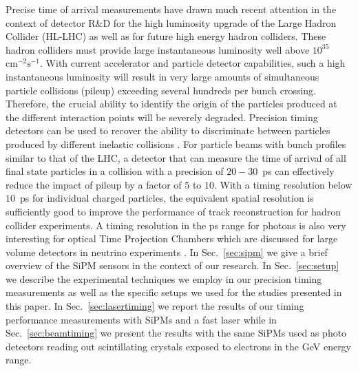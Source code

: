 Precise time of arrival measurements have drawn much recent attention in the 
context of detector R\&D for the high luminosity upgrade of the Large Hadron 
Collider (HL-LHC) as well as for future high energy hadron colliders.  
These hadron colliders must provide large 
instantaneous luminosity well above $10^{35}$~$\mathrm{cm}^{-2}\mathrm{s}^{-1}$.
With current accelerator and particle detector capabilities, such a high 
instantaneous luminosity will result in very large amounts
of simultaneous particle collisions (pileup) exceeding several hundreds per
bunch crossing. Therefore, the crucial ability to identify the origin 
of the particles produced at the different interaction points will be severely 
degraded. Precision timing detectors can be used to recover the ability to 
discriminate between particles produced by different inelastic collisions \cite{adielba}.
For particle beams with bunch profiles similar to that of the LHC, a detector 
that can measure the time of arrival of all final state particles in a collision
with a precision of $20-30$~ps can effectively reduce the impact of
pileup by a factor of $5$ to $10$. 
%
% 
% 
With a timing resolution below $10$~ps for individual charged particles, the equivalent spatial 
resolution is sufficiently good to improve the performance of 
track reconstruction \cite{4dtracking} for hadron collider experiments.
A timing resolution in the ps range for photons is also very interesting for optical Time Projection Chambers 
which are discussed for large volume detectors in neutrino experiments \cite{lappd, otpc}. 
%
%
%
In Sec.~\ref{sec:sipm} we give a brief overview of the SiPM sensors in the context of our research. In Sec.~\ref{sec:setup} 
we describe the experimental techniques we employ in our precision timing measurements as well as the specific setups we 
used for the studies presented in this paper. In Sec.~\ref{sec:lasertiming} we report the results of our timing 
performance measurements with SiPMs and a fast laser while in Sec.~\ref{sec:beamtiming} we present the results 
with the same SiPMs used as photo detectors reading out scintillating crystals exposed to electrons in the GeV energy range.

